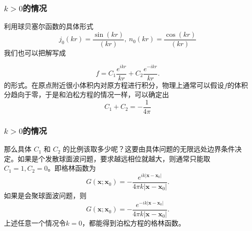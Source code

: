 \documentclass[CJK]{beamer}
\begin{document}
\begin{frame}
  \frametitle{$k>0$的情况}
  利用球贝塞尔函数的具体形式
  $$ j_0(kr) = \frac{\sin(kr)}{(kr)},\ n_0(kr) = \frac{\cos(kr)}{(kr)}$$
  我们也可以把解写成

  $$ f = C_1\frac{e^{ikr}}{kr} + C_2\frac{e^{-ikr}}{kr}. $$
  的形式。在原点附近很小体积内对原方程进行积分，物理上通常可以假设$f$的体积分趋向于零，于是和泊松方程的情况一样，可以确定出
   $$ C_1+C_2=-\frac{1}{4\pi}$$
\end{frame}

\begin{frame}
  \frametitle{$k>0$的情况}
  那么具体 $C_1$ 和 $C_2$ 的比例该取多少呢？这要由具体问题的无限远处边界条件决定。如果是个发散球面波问题，要求越远相位就越大，则通常只能取 $C_1=1, C_2=0$。即格林函数为
  $$ G(\mathbf{x};\mathbf{x}_0) = -\frac{e^{ik|\mathbf{x}-\mathbf{x}_0|}}{4\pi k|\mathbf{x}-\mathbf{x}_0|}.$$
  如果是会聚球面波问题，则
  $$ G(\mathbf{x};\mathbf{x}_0) = -\frac{e^{-ik|\mathbf{x}-\mathbf{x}_0|}}{4\pi k|\mathbf{x}-\mathbf{x}_0|}.$$  
  上述任意一个情况令$k=0$，都能得到泊松方程的格林函数。
    
\end{frame}


\ech
\end{document}
